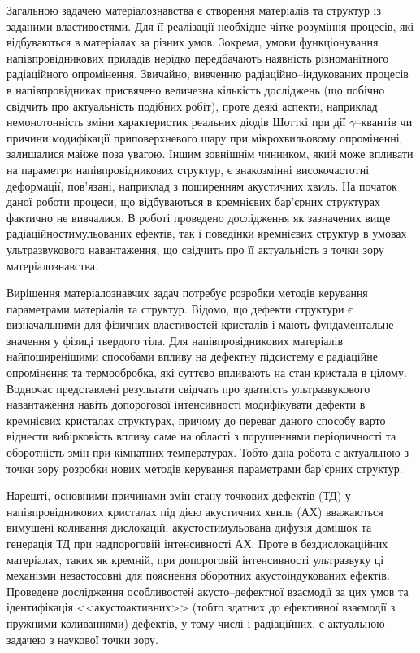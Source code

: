 Загальною задачею матеріалознавства є створення матеріалів та структур із заданими властивостями.
Для її реалізації необхідне чітке розуміння процесів, які відбуваються в матеріалах за різних умов.
Зокрема, умови функціонування напівпровідникових приладів нерідко передбачають наявність різноманітного радіаційного опромінення.
Звичайно, вивченню радіаційно--індукованих процесів в напівпровідниках присвячено величезна кількість досліджень (що побічно свідчить про актуальність подібних робіт), проте деякі аспекти, наприклад немонотонність зміни характеристик реальних діодів Шотткі при дії $\gamma$--квантів чи причини модифікації приповерхневого шару при мікрохвильовому опроміненні, залишалися майже поза увагою.
Іншим зовнішнім чинником, який може впливати на параметри напівпровідникових структур, є знакозмінні високочастотні деформації, пов'язані, наприклад з поширенням акустичних хвиль.
На початок даної роботи процеси, що відбуваються в кремнієвих бар'єрних структурах фактично не вивчалися.
В роботі проведено дослідження як зазначених вище радіаційностимульованих ефектів, так і поведінки кремнієвих структур в умовах ультразвукового навантаження, що свідчить про її актуальність з точки зору матеріалознавства.


Вирішення матеріалознавчих задач потребує розробки методів керування параметрами матеріалів та структур.
Відомо, що дефекти структури є визначальними для фізичних властивостей кристалів і мають фундаментальне значення у фізиці твердого тіла.
Для напівпровідникових матеріалів найпоширенішими способами впливу на дефектну підсистему є радіаційне опромінення та термообробка, які суттєво впливають на стан кристала в цілому.
Водночас представлені результати свідчать про здатність ультразвукового навантаження навіть допорогової інтенсивності модифікувати дефекти в кремнієвих кристалах структурах, причому до переваг даного способу варто віднести вибірковість впливу саме на області з порушеннями періодичності та оборотність змін при кімнатних температурах.
Тобто дана робота є актуальною з точки зору розробки нових методів керування параметрами бар'єрних структур.

Нарешті, основними причинами змін стану точкових дефектів (ТД) у напівпровідникових кристалах під дією акустичних хвиль (АХ) вважаються вимушені коливання дислокацій, акустостимульована дифузія домішок та генерація ТД при надпороговій інтенсивності АХ.
Проте в бездислокаційних матеріалах, таких як кремній, при допороговій інтенсивності ультразвуку ці механізми  незастосовні для пояснення оборотних акустоіндукованих ефектів.
Проведене дослідження особливостей акусто--дефектної взаємодії за цих умов та ідентифікація <<акустоактивних>> (тобто здатних до ефективної взаємодії з пружними коливаннями) дефектів, у тому числі і радіаційних, є актуальною задачею з наукової точки зору.

